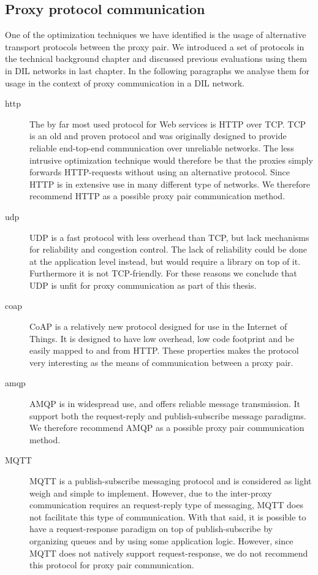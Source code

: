 \subsection{Proxy protocol communication}

One of the optimization techniques we have identified is the usage of
alternative transport protocols between the proxy pair. We introduced a set of
protocols in the technical background chapter and discussed previous evaluations
using them in DIL networks in last chapter. In the following paragraphs we
analyse them for usage in the context of proxy communication in a DIL network.

\begin{description}

    \item[\gls{http}] The by far most used protocol for Web services is HTTP
    over TCP. TCP is an old and proven protocol and was originally designed to
    provide reliable end-top-end communication over unreliable networks. The
    less intrusive optimization technique would therefore be that the proxies
    simply forwards HTTP-requests without using an alternative protocol. Since
    HTTP is in extensive use in many different type of networks. We therefore
    recommend HTTP as a possible proxy pair communication method.

    \item[\gls{udp}] UDP is a fast protocol with less overhead than TCP, but
    lack mechanisms for reliability and congestion control. The lack of
    reliability could be done at the application level instead, but would
    require a library on top of it. Furthermore it is not TCP-friendly. For
    these reasons we conclude that UDP is unfit for proxy communication as part
    of this thesis.

    \item[\gls{coap}] CoAP is a relatively new protocol designed for use in the
    Internet of Things. It is designed to have low overhead, low code footprint
    and be easily mapped to and from HTTP. These properties makes the protocol
    very interesting as the means of communication between a proxy pair.

    \item[\gls{amqp}] AMQP is in widespread use, and offers reliable message
    transmission. It support both the request-reply and publish-subscribe message paradigms. We therefore recommend AMQP as a possible proxy pair communication method.

    \item[MQTT] MQTT is a publish-subscribe messaging protocol and is considered
    as light weigh and simple to implement. However, due to the inter-proxy
    communication requires an request-reply type of messaging, MQTT does not
    facilitate this type of communication. With that said, it is possible to
    have a request-response paradigm on top of publish-subscribe by organizing
    queues and by using some application logic. However, since MQTT does not
    natively support request-response, we do not recommend this protocol for
    proxy pair communication.


\end{description}
